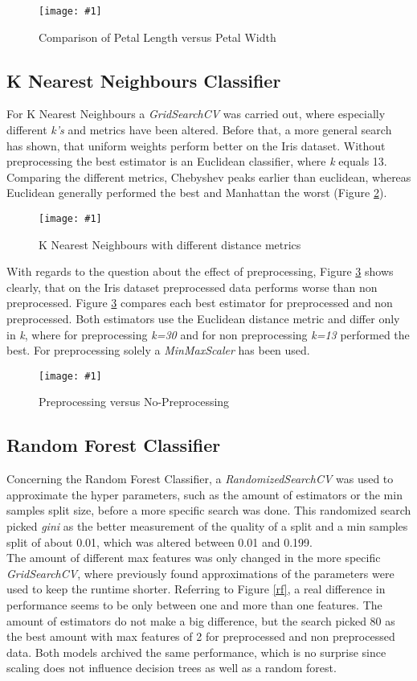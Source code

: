 \documentclass{article}
\newcommand{\size}{0.8\textwidth}
\newcommand{\image}[3]{
\begin{figure}
\begin{center}
\texttt{[image: \#1]}
\caption{#2}
#3
\end{center}
\end{figure}
}
\begin{document}
\image{plots/petal.png}{Comparison of Petal Length versus Petal Width}{\label{petal}}

\subsection{K Nearest Neighbours Classifier}
For K Nearest Neighbours a \textit{GridSearchCV} was carried out, where especially different \textit{k's} and metrics have been altered. Before that, a more general search has shown, that uniform weights perform better on the Iris dataset. Without preprocessing the best estimator is an Euclidean classifier, where \textit{k} equals 13. Comparing the different metrics, Chebyshev peaks earlier than euclidean, whereas Euclidean generally performed the best and Manhattan the worst (Figure \ref{knn}). 

\image{plots/knn_np_comparision.png}{K Nearest Neighbours with different distance metrics}{\label{knn}}

With regards to the question about the effect of preprocessing, Figure \ref{prepro} shows clearly, that on the Iris dataset preprocessed data performs worse than non preprocessed. Figure \ref{prepro} compares each best estimator for preprocessed and non preprocessed. Both estimators use the Euclidean distance metric and differ only in \textit{k}, where for preprocessing \textit{k=30} and for non preprocessing \textit{k=13} performed the best.  For preprocessing solely a \textit{MinMaxScaler} has been used.

\image{plots/knn_np_p_comparision.png}{Preprocessing versus No-Preprocessing}{\label{prepro}}

\subsection{Random Forest Classifier}
Concerning the Random Forest Classifier, a \textit{RandomizedSearchCV} was used to approximate the hyper parameters, such as the amount of estimators or the min samples split size, before a more specific search was done. This randomized search picked \textit{gini} as the better measurement of the quality of  a split and a min samples split of about 0.01, which was altered between 0.01 and 0.199. \\
The amount of different max features was only changed in the more specific \textit{GridSearchCV}, where previously found approximations of the parameters were used to keep the runtime shorter. Referring to Figure \ref{rf}, a real difference in performance seems to be only between one and more than one features. The amount of estimators do not make a big difference, but the search picked 80 as the best amount with max features of 2 for preprocessed and non preprocessed data. Both models archived the same performance, which is no surprise since scaling does not influence decision trees as well as a random forest.
\end{document}
